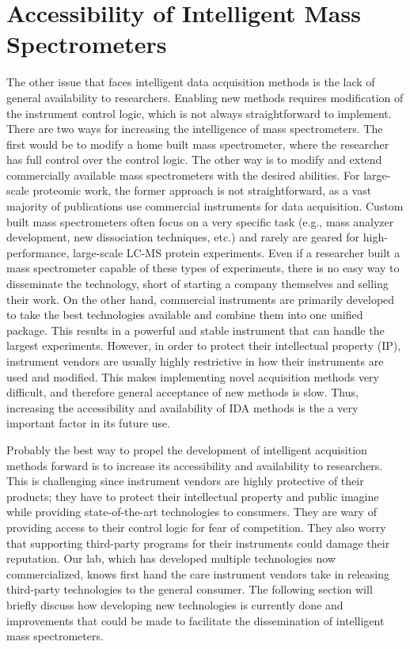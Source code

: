 \section{Accessibility of Intelligent Mass Spectrometers}
The other issue that faces intelligent data acquisition methods is the lack of general availability to researchers. Enabling new methods requires modification of the instrument control logic, which is not always straightforward to implement. There are two ways for increasing the intelligence of mass spectrometers. The first would be to modify a home built mass spectrometer, where the researcher has full control over the control logic. The other way is to modify and extend commercially available mass spectrometers with the desired abilities. For large-scale proteomic work, the former approach is not straightforward, as a vast majority of publications use commercial instruments for data acquisition. Custom built mass spectrometers often focus on a very specific task (e.g., mass analyzer development, new dissociation techniques, etc.) and rarely are geared for high-performance, large-scale LC-MS protein experiments. Even if a researcher built a mass spectrometer capable of these types of experiments, there is no easy way to disseminate the technology, short of starting a company themselves and selling their work. On the other hand, commercial instruments are primarily developed to take the best technologies available and combine them into one unified package. This results in a powerful and stable instrument that can handle the largest experiments. However, in order to protect their intellectual property (IP), instrument vendors are usually highly restrictive in how their instruments are used and modified. This makes implementing novel acquisition methods very difficult, and therefore general acceptance of new methods is slow. Thus, increasing the accessibility and availability of IDA methods is the a very important factor in its future use.

Probably the best way to propel the development of intelligent acquisition methods forward is to increase its accessibility and availability to researchers. This is challenging since instrument vendors are highly protective of their products; they have to protect their intellectual property and public imagine while providing state-of-the-art technologies to consumers. They are wary of providing access to their control logic for fear of competition. They also worry that supporting third-party programs for their instruments could damage their reputation. Our lab, which has developed multiple technologies now commercialized, knows first hand the care instrument vendors take in releasing third-party technologies to the general consumer. The following section will briefly discuss how developing new technologies is currently done and improvements that could be made to facilitate the dissemination of intelligent mass spectrometers.  

